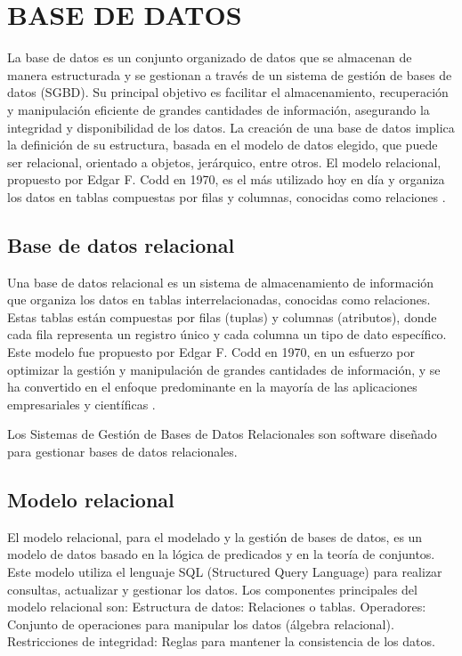	\section{BASE DE DATOS}
		La base de datos es un conjunto organizado de datos que se almacenan de manera estructurada y se gestionan a través de un sistema de gestión de bases de datos (SGBD). Su principal objetivo es facilitar el almacenamiento, recuperación y manipulación eficiente de grandes cantidades de información, asegurando la integridad y disponibilidad de los datos. La creación de una base de datos implica la definición de su estructura, basada en el modelo de datos elegido, que puede ser relacional, orientado a objetos, jerárquico, entre otros. El modelo relacional, propuesto por Edgar F. Codd en 1970, es el más utilizado hoy en día y organiza los datos en tablas compuestas por filas y columnas, conocidas como relaciones \parencite{codd1970relational}.
	\subsection{Base de datos relacional}
		Una base de datos relacional es un sistema de almacenamiento de información que organiza los datos en tablas interrelacionadas, conocidas como relaciones. Estas tablas están compuestas por filas (tuplas) y columnas (atributos), donde cada fila representa un registro único y cada columna un tipo de dato específico. Este modelo fue propuesto por Edgar F. Codd en 1970, en un esfuerzo por optimizar la gestión y manipulación de grandes cantidades de información, y se ha convertido en el enfoque predominante en la mayoría de las aplicaciones empresariales y científicas \textcite{codd1970relational}.
		
		Los Sistemas de Gestión de Bases de Datos Relacionales son software diseñado para gestionar bases de datos relacionales.
		
	\subsection{Modelo relacional}
		El modelo relacional, para el modelado y la gestión de bases de datos, es un modelo de datos basado en la lógica de predicados y en la teoría de conjuntos. Este modelo utiliza el lenguaje SQL (Structured Query Language) para realizar consultas, actualizar y gestionar los datos. Los componentes principales del modelo relacional son: Estructura de datos: Relaciones o tablas. Operadores: Conjunto de operaciones para manipular los datos (álgebra relacional). Restricciones de integridad: Reglas para mantener la consistencia de los datos.
		
